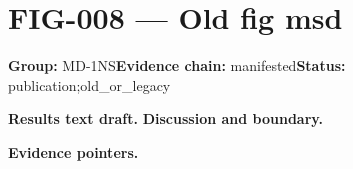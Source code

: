 \clearpage
\section{FIG-008 --- Old fig msd}
\label{figpage:fig-008}
\textbf{Group:} MD-1NS\quad \textbf{Evidence chain:} manifested\quad \textbf{Status:} publication;old\_or\_legacy

\textbf{Results text draft.} 
\textbf{Discussion and boundary.} 


\textbf{Evidence pointers.}



\vfill
